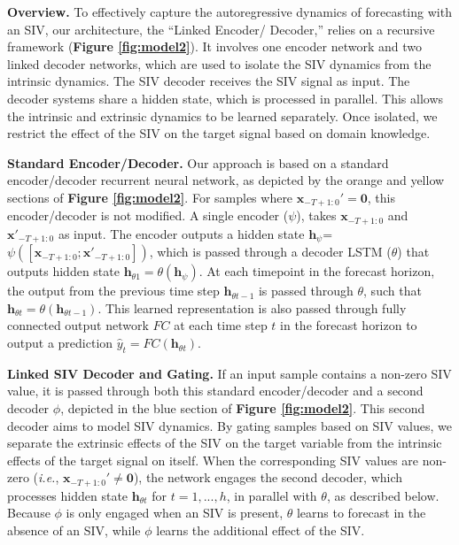 \documentclass[letterpaper]{article}
\begin{document}
\textbf{Overview.} To effectively capture the autoregressive dynamics of forecasting  with an SIV, our architecture, the ``Linked Encoder/ Decoder,''  relies on a recursive framework (\textbf{Figure \ref{fig:model2}}). It involves one encoder network and two linked decoder networks, which are used to isolate the SIV dynamics from the intrinsic dynamics. The SIV decoder receives the SIV signal as input. The decoder systems share a hidden state, which is processed in parallel. This allows the intrinsic and extrinsic dynamics to be learned separately. Once isolated, we restrict the effect of the SIV on the target signal based on domain knowledge.



\textbf{Standard Encoder/Decoder.} Our approach is based on a standard encoder/decoder recurrent neural network, as depicted by the orange and yellow sections of \textbf{Figure \ref{fig:model2}}. For samples where $\mathbf{x}_{-T+1:0}'=\mathbf{0}$, this encoder/decoder is not modified. A single encoder ($\psi$),  takes  $\mathbf{x}_{-T+1:0}$ and  $\mathbf{x}'_{-T+1:0}$ as input. The encoder outputs a hidden state $\mathbf{h}_{\psi}$= $\psi([\mathbf{x}_{-T+1:0} ; \mathbf{x}'_{-T+1:0}])$, which is passed through a decoder LSTM ($\theta$) that outputs hidden state $\mathbf{h}_{{\theta}1}=\theta(\mathbf{h}_{\psi})$. At each timepoint in the forecast horizon, the output from the previous time step $\mathbf{h}_{{\theta}t-1}$ is passed through $\theta$, such that $\mathbf{h}_{{\theta}t}=\theta(\mathbf{h}_{{\theta}t-1})$. This learned representation is also passed through fully connected output network $FC$ at each time step $t$ in the forecast horizon to output a prediction $\hat{y}_t=FC(\mathbf{h}_{{\theta}t})$.

\textbf{Linked SIV Decoder and Gating.} If an input sample contains a non-zero SIV value, it is passed through both this standard encoder/decoder and a second decoder $\phi$, depicted in the blue section of \textbf{Figure \ref{fig:model2}}. This second decoder aims to model SIV dynamics. By gating samples based on SIV values, we separate the extrinsic effects of the SIV on the target variable from the intrinsic effects of the target signal on itself. When the corresponding SIV values are non-zero (\textit{i.e.}, $\mathbf{x}_{-T+1:0}'\neq \mathbf{0}$), the network engages the second decoder, which processes hidden state $\mathbf{h}_{{\theta}t}$ for $t=1,...,h$, in parallel with $\theta$, as described below. Because $\phi$ is only engaged when an SIV is present, $\theta$ learns to forecast in the absence of an SIV, while $\phi$ learns the additional effect of the SIV.
\end{document}

